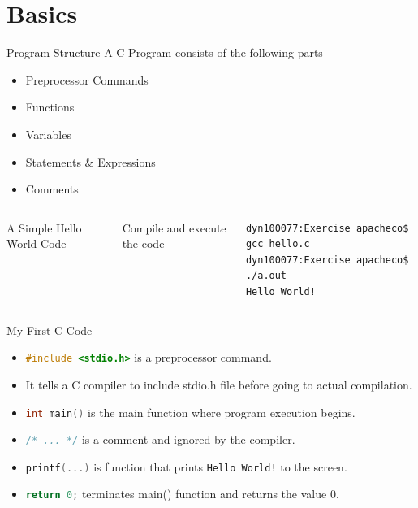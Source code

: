\documentclass[10pt,t]{beamer}
\begin{document}
\section{Basics}
\begin{frame}[fragile]{Program Structure}
A C Program consists of the following parts
  \begin{itemize}
    \item Preprocessor Commands
    \item Functions
    \item Variables
    \item Statements \& Expressions
    \item Comments
  \end{itemize}
  \begin{columns}
    A Simple Hello World Code
    
    Compile and execute the code
    \begin{lstlisting}[style=LINUX]
dyn100077:Exercise apacheco$ gcc hello.c 
dyn100077:Exercise apacheco$ ./a.out 
Hello World!
    \end{lstlisting}
  \end{columns}
\end{frame}

\begin{frame}[fragile]{My First C Code}
  
  \begin{itemize}
    \item \lstinline[language=C,basicstyle=\scriptsize\ttfamily]|#include <stdio.h>| is a preprocessor command.
    \item[] It tells a C compiler to include stdio.h file before going to actual compilation.
    \item \lstinline[language=C,basicstyle=\scriptsize\ttfamily]|int main()| is the main function where program execution begins.
    \item \lstinline[language=C,basicstyle=\scriptsize\ttfamily]|/* ... */| is a comment and ignored by the compiler.
    \item \lstinline[language=C,basicstyle=\scriptsize\ttfamily]|printf(...)| is function that prints \lstinline[language=C,basicstyle=\scriptsize\ttfamily]|Hello World!| to the screen.
    \item \lstinline[language=C,basicstyle=\scriptsize\ttfamily]|return 0;| terminates main() function and returns the value 0.
  \end{itemize}
\end{frame}
\end{document}
